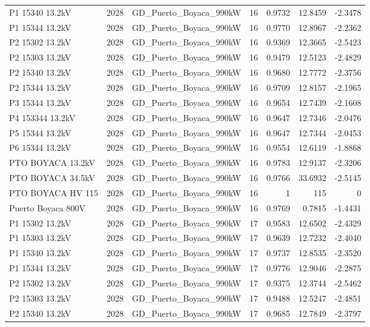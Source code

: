 \documentclass[11pt,a4paper]{article}
\begin{document}
\begin{longtable}{llllrrr}
P1 15340 13.2kV & 2028 & GD\_Puerto\_Boyaca\_990kW & 16 & 0.9732 & 12.8459 & -2.3478 \\
P1 15344 13.2kV & 2028 & GD\_Puerto\_Boyaca\_990kW & 16 & 0.9770 & 12.8967 & -2.2362 \\
P2 15302 13.2kV & 2028 & GD\_Puerto\_Boyaca\_990kW & 16 & 0.9369 & 12.3665 & -2.5423 \\
P2 15303 13.2kV & 2028 & GD\_Puerto\_Boyaca\_990kW & 16 & 0.9479 & 12.5123 & -2.4829 \\
P2 15340 13.2kV & 2028 & GD\_Puerto\_Boyaca\_990kW & 16 & 0.9680 & 12.7772 & -2.3756 \\
P2 15344 13.2kV & 2028 & GD\_Puerto\_Boyaca\_990kW & 16 & 0.9709 & 12.8157 & -2.1965 \\
P3 15344 13.2kV & 2028 & GD\_Puerto\_Boyaca\_990kW & 16 & 0.9654 & 12.7439 & -2.1608 \\
P4 153344 13.2kV & 2028 & GD\_Puerto\_Boyaca\_990kW & 16 & 0.9647 & 12.7346 & -2.0476 \\
P5 15344 13.2kV & 2028 & GD\_Puerto\_Boyaca\_990kW & 16 & 0.9647 & 12.7344 & -2.0453 \\
P6 15344 13.2kV & 2028 & GD\_Puerto\_Boyaca\_990kW & 16 & 0.9554 & 12.6119 & -1.8868 \\
PTO BOYACA 13.2kV & 2028 & GD\_Puerto\_Boyaca\_990kW & 16 & 0.9783 & 12.9137 & -2.3206 \\
PTO BOYACA 34.5kV & 2028 & GD\_Puerto\_Boyaca\_990kW & 16 & 0.9766 & 33.6932 & -2.5145 \\
PTO BOYACA HV 115 & 2028 & GD\_Puerto\_Boyaca\_990kW & 16 & 1 & 115 & 0 \\
Puerto Boyaca 800V & 2028 & GD\_Puerto\_Boyaca\_990kW & 16 & 0.9769 & 0.7815 & -1.4431 \\
P1 15302 13.2kV & 2028 & GD\_Puerto\_Boyaca\_990kW & 17 & 0.9583 & 12.6502 & -2.4329 \\
P1 15303 13.2kV & 2028 & GD\_Puerto\_Boyaca\_990kW & 17 & 0.9639 & 12.7232 & -2.4040 \\
P1 15340 13.2kV & 2028 & GD\_Puerto\_Boyaca\_990kW & 17 & 0.9737 & 12.8535 & -2.3520 \\
P1 15344 13.2kV & 2028 & GD\_Puerto\_Boyaca\_990kW & 17 & 0.9776 & 12.9046 & -2.2875 \\
P2 15302 13.2kV & 2028 & GD\_Puerto\_Boyaca\_990kW & 17 & 0.9375 & 12.3744 & -2.5462 \\
P2 15303 13.2kV & 2028 & GD\_Puerto\_Boyaca\_990kW & 17 & 0.9488 & 12.5247 & -2.4851 \\
P2 15340 13.2kV & 2028 & GD\_Puerto\_Boyaca\_990kW & 17 & 0.9685 & 12.7849 & -2.3797 \\

\end{longtable}
\end{document}
